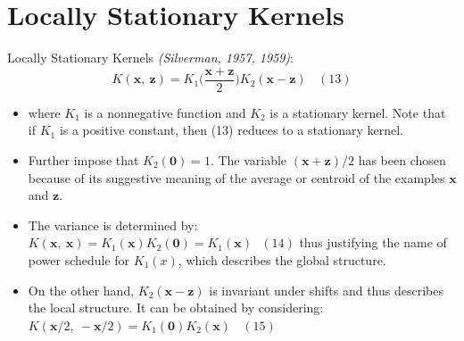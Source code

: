 \documentclass[
  ignorenonframetext,
]{beamer}
\begin{document}
\hypertarget{locally-stationary-kernels}{%
\section{Locally Stationary Kernels}\label{locally-stationary-kernels}}

\begin{frame}{Locally Stationary Kernels}
\protect\hypertarget{locally-stationary-kernels-1}{}
\emph{(Silverman, 1957, 1959)}: \[
K(\pmb x,\ \pmb z) = K_1 \Big(\frac {\pmb x + \pmb z} 2 \Big) K_2(\pmb x - \pmb z) \ \ \ \ (13)
\]

\begin{itemize}
\item
  where \(K_1\) is a nonnegative function and \(K_2\) is a stationary
  kernel. Note that if \(K_1\) is a positive constant, then (13) reduces
  to a stationary kernel.
\item
  Further impose that \(K_2(\pmb 0) = 1\). The variable
  \((\pmb x + \pmb z)/2\) has been chosen because of its suggestive
  meaning of the average or centroid of the examples \(\pmb x\) and
  \(\pmb z\).
\end{itemize}
\end{frame}

\begin{frame}{}
\protect\hypertarget{section-13}{}
\begin{itemize}
\item
  The variance is determined by:
  \(K(\pmb x,\ \pmb x) = K_1(\pmb x)K_2(\pmb 0) = K_1(\pmb x)\ \ \  (14)\)
  thus justifying the name of power schedule for \(K_1(x)\), which
  describes the global structure.
\item
  On the other hand, \(K_2(\pmb x-\pmb z)\) is invariant under shifts
  and thus describes the local structure. It can be obtained by
  considering:
  \(K(\pmb x/2,\ -\pmb x/2) = K_1(\pmb 0)K_2(\pmb x) \ \ \ \ (15)\)
\end{itemize}
\end{frame}
\end{document}

